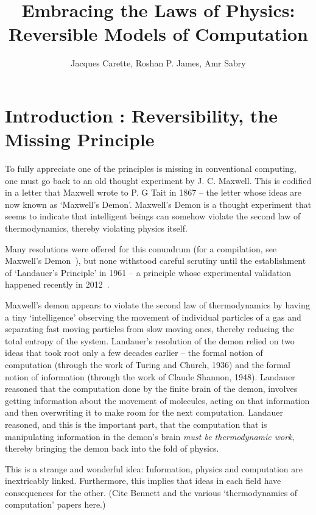 \documentclass{article}
\title{Embracing the Laws of Physics: \\ Reversible Models of Computation}
\author{Jacques Carette, Roshan P. James, Amr Sabry}
\begin{document}
\maketitle

\section{Introduction : Reversibility, the Missing Principle}


To fully appreciate one of the principles is missing in conventional computing,
one must go back to an old thought experiment by J. C. Maxwell. This is
codified in a letter that Maxwell wrote to P. G Tait in 1867 -- 
the letter whose ideas are now known as `Maxwell's
Demon'. Maxwell's Demon is a thought experiment that seems to
indicate that intelligent beings can somehow violate the second law of
thermodynamics, thereby violating physics itself.

Many resolutions were offered for this conundrum (for a compilation, see
Maxwell's Demon~\cite{leff1990}), but none withstood careful
scrutiny until the establishment of `Landauer's Principle' in 1961 -- a
principle whose experimental validation
happened recently in 2012~\cite{berut2012experimental}.

Maxwell's demon appears to violate the second law of thermodynamics by
having a tiny `intelligence' observing the movement of individual
particles of a gas and separating fast moving particles from slow
moving ones, thereby reducing the total entropy of the
system. Landauer's resolution of the demon relied on two ideas that
took root only a few decades earlier -- the formal notion of
computation (through the work of Turing and Church, 1936) and the
formal notion of information (through the work of Claude Shannon,
1948). Landauer reasoned that the computation done by the finite brain
of the demon, involves getting information about the movement of
molecules, acting on that information and then overwriting it to make
room for the next computation.  Landauer reasoned, and this is the
important part, that the computation that is manipulating information
in the demon's brain \textit{must be thermodynamic work}, thereby
bringing the demon back into the fold of physics.

This is a strange and wonderful idea: Information,
physics and computation are inextricably linked. Furthermore, this
implies that ideas in each field have consequences for the other. 
(Cite Bennett and the various `thermodynamics of computation' papers here.)
\end{document}
